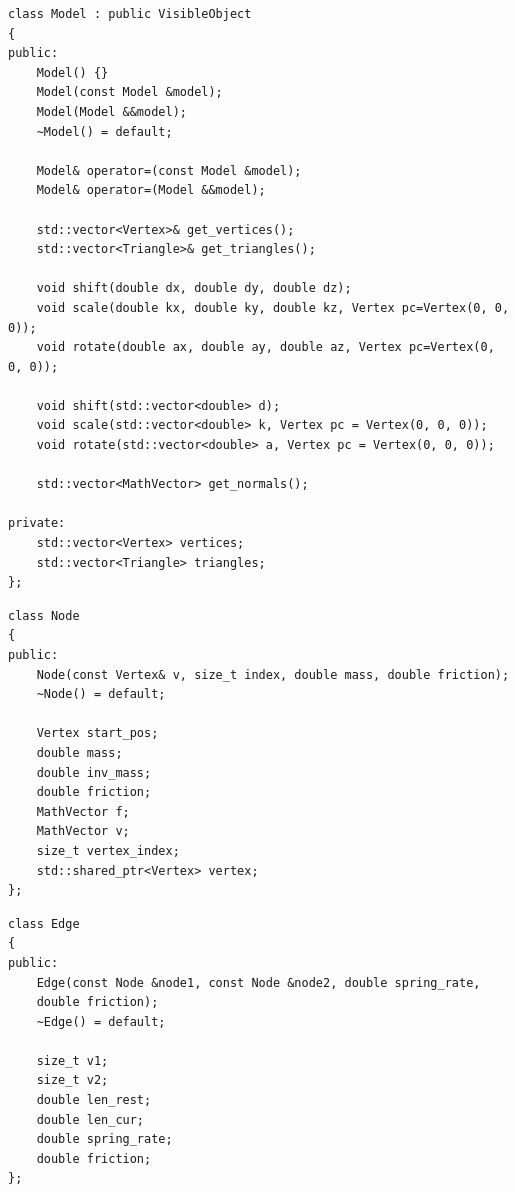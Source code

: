 \begin{lstlisting}[caption=Класс <<модель>> Model, label=list:model]
class Model : public VisibleObject
{
public:
	Model() {}
	Model(const Model &model);
	Model(Model &&model);
	~Model() = default;
	
	Model& operator=(const Model &model);
	Model& operator=(Model &&model);
	
	std::vector<Vertex>& get_vertices();
	std::vector<Triangle>& get_triangles();
	
	void shift(double dx, double dy, double dz);
	void scale(double kx, double ky, double kz, Vertex pc=Vertex(0, 0, 0));
	void rotate(double ax, double ay, double az, Vertex pc=Vertex(0, 0, 0));
	
	void shift(std::vector<double> d);
	void scale(std::vector<double> k, Vertex pc = Vertex(0, 0, 0));
	void rotate(std::vector<double> a, Vertex pc = Vertex(0, 0, 0));
	
	std::vector<MathVector> get_normals();

private:
	std::vector<Vertex> vertices;
	std::vector<Triangle> triangles;
};
\end{lstlisting}

\begin{lstlisting}[caption=Класс <<узел>> Node, label=list:mwidget]
class Node
{
public:
	Node(const Vertex& v, size_t index, double mass, double friction);
	~Node() = default;
	
	Vertex start_pos;
	double mass;
	double inv_mass;
	double friction;
	MathVector f;
	MathVector v;
	size_t vertex_index;
	std::shared_ptr<Vertex> vertex;
};
\end{lstlisting}

\begin{lstlisting}[caption=Класс <<ребро>> Edge, label=list:edge]
class Edge
{
public:
	Edge(const Node &node1, const Node &node2, double spring_rate,
	double friction);
	~Edge() = default;
	
	size_t v1;
	size_t v2;
	double len_rest;
	double len_cur;
	double spring_rate;
	double friction;
};
\end{lstlisting}

